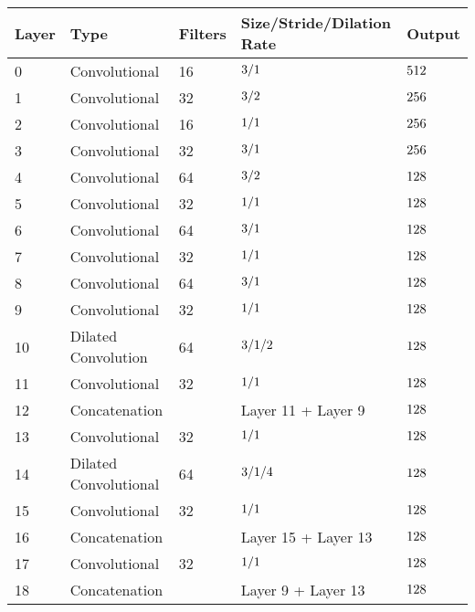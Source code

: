\begin{table}[h!]
\centering
\begin{tabular}{@{}lllll@{}}
\toprule
Layer & Type          & Filters & Size/Stride/Dilation Rate   & Output                        \\ \midrule
0     & Convolutional & 16      &$ 3 \time 3/1  $               &$ 512 \time 512$ \\
1     & Convolutional & 32      &$ 3 \time 3/2  $               &$ 256 \time 256$ \\
2     & Convolutional & 16      &$ 1 \time 1/1  $               &$ 256 \time 256$ \\
3     & Convolutional & 32      &$ 3 \time 3/1  $               &$ 256 \time 256$ \\
4     & Convolutional & 64      &$ 3 \time 3/2  $               &$ 128 \time 128$ \\
5     & Convolutional & 32      &$ 1 \time 1/1  $               &$ 128 \time 128$ \\
6     & Convolutional & 64      &$ 3 \time 3/1  $               &$ 128 \time 128$ \\
7     & Convolutional & 32      &$ 1 \time 1/1  $               &$ 128 \time 128$ \\
8     & Convolutional & 64      &$ 3 \time 3/1  $               &$ 128 \time 128$ \\
9     & Convolutional & 32      &$ 1 \time 1/1  $               &$ 128 \time 128$ \\
10    & Dilated Convolution & 64&$ 3 \time 3/1/2$               &$ 128 \time 128$ \\
11    & Convolutional & 32      &$ 1 \time 1/1  $               &$ 128 \time 128$ \\
12    & Concatenation &         &  Layer 11 + Layer 9           &$ 128 \time 128$ \\
13    & Convolutional & 32      & $1 \time 1/1$                 &$ 128 \time 128$ \\
14    & Dilated Convolutional & 64      &  $3 \time 3/1/4$      &$ 128 \time 128$ \\
15    & Convolutional & 32      &  $1 \time 1/1$                &$ 128 \time 128$ \\
16    & Concatenation &         &  Layer 15 + Layer 13          &$ 128 \time 128$ \\
17    & Convolutional & 32      &  $1 \time 1/1$                &$ 128 \time 128$ \\
18    & Concatenation &         &  Layer 9 + Layer 13           &$ 128 \time 128$ \\

\end{tabular}
\end{table}
